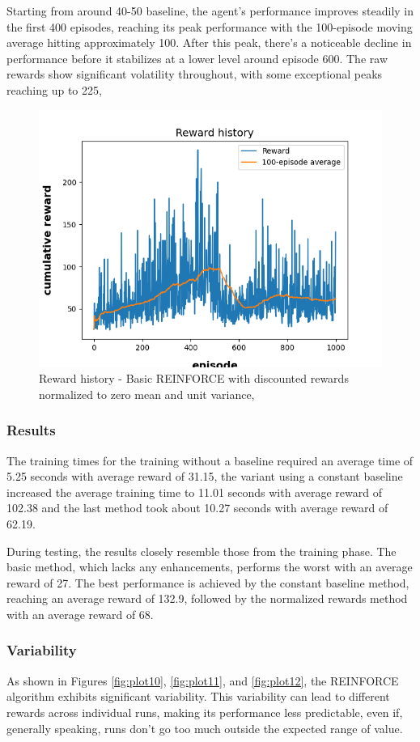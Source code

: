 \documentclass{article}
\begin{document}
Starting from around 40-50 baseline, the agent's performance improves steadily in the first 400 episodes, reaching its peak performance with the 100-episode moving average hitting approximately 100. After this peak, there's a noticeable decline in performance before it stabilizes at a lower level around episode 600. The raw rewards  show significant volatility throughout, with some exceptional peaks reaching up to 225, 

\begin{figure}[h]
	\centering
	\includegraphics[width=0.5\linewidth]{../data/plot/reward_history_ContinuousCartPole-v0_0_normalized.png}
	\caption{Reward history - Basic REINFORCE with discounted rewards normalized to zero mean and unit variance,}
	\label{fig:plot5}
\end{figure}

\newpage

\subsubsection{Results}
The training times for the training without a baseline required an average time of 5.25 seconds with average reward of 31.15, the variant using a constant baseline increased the average training time to 11.01 seconds with average reward of 102.38 and the last method took about 10.27 seconds with average reward of 62.19.

During testing, the results closely resemble those from the training phase. The basic method, which lacks any enhancements, performs the worst with an average reward of 27. The best performance is achieved by the constant baseline method, reaching an average reward of 132.9, followed by the normalized rewards method with an average reward of 68.



\subsubsection{Variability}
As shown in Figures \ref{fig:plot10}, \ref{fig:plot11}, and \ref{fig:plot12}, the REINFORCE algorithm exhibits significant variability. This variability can lead to different rewards across individual runs, making its performance less predictable, even if, generally speaking, runs don't go too much outside the expected range of value.
\end{document}
